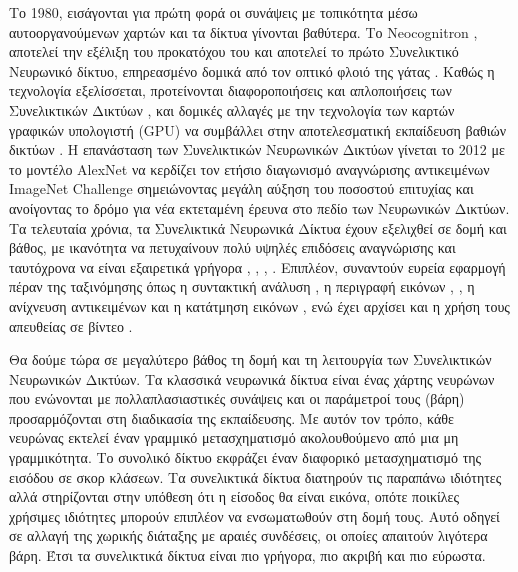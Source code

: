 \documentclass[11pt,a4paper,english,greek,twoside]{../Thesis}
\begin{document}
\par Το 1980, εισάγονται για πρώτη φορά οι συνάψεις με τοπικότητα μέσω αυτοοργανούμενων χαρτών και τα δίκτυα γίνονται βαθύτερα. Το Neocognitron \cite{fukushima_1980}, αποτελεί την εξέλιξη του προκατόχου του \cite{fukushima_1975} και αποτελεί το πρώτο Συνελικτικό Νευρωνικό δίκτυο, επηρεασμένο δομικά από τον οπτικό φλοιό της γάτας \cite{hubel_1962}. Καθώς η τεχνολογία εξελίσσεται, προτείνονται διαφοροποιήσεις \cite{lecun_1998} και απλοποιήσεις των Συνελικτικών Δικτύων \cite{behnke_2003}, \cite{simard_2003} και δομικές αλλαγές \cite{ciresan_2011} με την τεχνολογία των καρτών γραφικών υπολογιστή (GPU) να συμβάλλει στην αποτελεσματική εκπαίδευση βαθιών δικτύων \cite{ciresan_2012}. Η επανάσταση των Συνελικτικών Νευρωνικών Δικτύων γίνεται το 2012 \cite{alexnet_2012} με το μοντέλο AlexNet να κερδίζει τον ετήσιο διαγωνισμό αναγνώρισης αντικειμένων ImageNet Challenge σημειώνοντας μεγάλη αύξηση του ποσοστού επιτυχίας και ανοίγοντας το δρόμο για νέα εκτεταμένη έρευνα στο πεδίο των Νευρωνικών Δικτύων. Τα τελευταία χρόνια, τα Συνελικτικά Νευρωνικά Δίκτυα έχουν εξελιχθεί σε δομή και βάθος, με ικανότητα να πετυχαίνουν πολύ υψηλές επιδόσεις αναγνώρισης και ταυτόχρονα να είναι εξαιρετικά γρήγορα \cite{zeiler_2013}, \cite{szegedy_2015}, \cite{he_2015}, \cite{donahue_2015}. Επιπλέον, συναντούν ευρεία εφαρμογή πέραν της ταξινόμησης όπως η συντακτική ανάλυση \cite{chen_2014_fast}, η περιγραφή εικόνων \cite{yang_2015_neural}, \cite{vinyals_2015}, η ανίχνευση αντικειμένων \cite{ren_2016} και η κατάτμηση εικόνων \cite{long_2016}, ενώ έχει αρχίσει και η χρήση τους απευθείας σε βίντεο \cite{karpathy_2014}.

\par Θα δούμε τώρα σε μεγαλύτερο βάθος τη δομή και τη λειτουργία των Συνελικτικών Νευρωνικών Δικτύων. Τα κλασσικά νευρωνικά δίκτυα είναι ένας χάρτης νευρώνων που ενώνονται με πολλαπλασιαστικές συνάψεις και οι παράμετροί τους (βάρη) προσαρμόζονται στη διαδικασία της εκπαίδευσης. Με αυτόν τον τρόπο, κάθε νευρώνας εκτελεί έναν γραμμικό μετασχηματισμό ακολουθούμενο από μια μη γραμμικότητα. Το συνολικό δίκτυο εκφράζει έναν διαφορικό μετασχηματισμό της εισόδου σε σκορ κλάσεων. Τα συνελικτικά δίκτυα διατηρούν τις παραπάνω ιδιότητες αλλά στηρίζονται στην υπόθεση ότι η είσοδος θα είναι εικόνα, οπότε ποικίλες χρήσιμες ιδιότητες μπορούν επιπλέον να ενσωματωθούν στη δομή τους. Αυτό οδηγεί σε αλλαγή της χωρικής διάταξης με αραιές συνδέσεις, οι οποίες απαιτούν λιγότερα βάρη. Έτσι τα συνελικτικά δίκτυα είναι πιο γρήγορα, πιο ακριβή και πιο εύρωστα.
\end{document}
